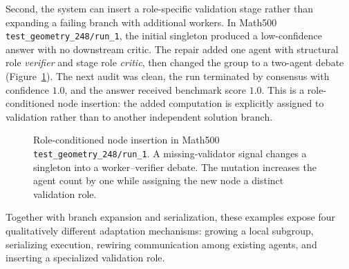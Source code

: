 Second, the system can insert a role-specific validation stage rather than
expanding a failing branch with additional workers.  In Math500
\texttt{test\_geometry\_248/run\_1}, the initial singleton produced a
low-confidence answer with no downstream critic.  The repair added one agent
with structural role \emph{verifier} and stage role \emph{critic}, then changed
the group to a two-agent debate (Figure~\ref{fig:mutation-verifier}).  The next
audit was clean, the run terminated by consensus with confidence $1.0$, and the
answer received benchmark score $1.0$.  This is a role-conditioned node
insertion: the added computation is explicitly assigned to validation rather
than to another independent solution branch.

\begin{figure}[t]
  \centering
  \caption{Role-conditioned node insertion in Math500
  \texttt{test\_geometry\_248/run\_1}. A missing-validator signal changes a
  singleton into a worker--verifier debate. The mutation increases the agent
  count by one while assigning the new node a distinct validation role.}
  \label{fig:mutation-verifier}
\end{figure}

Together with branch expansion and serialization, these examples expose four
qualitatively different adaptation mechanisms: growing a local subgroup,
serializing execution, rewiring communication among existing agents, and
inserting a specialized validation role.

